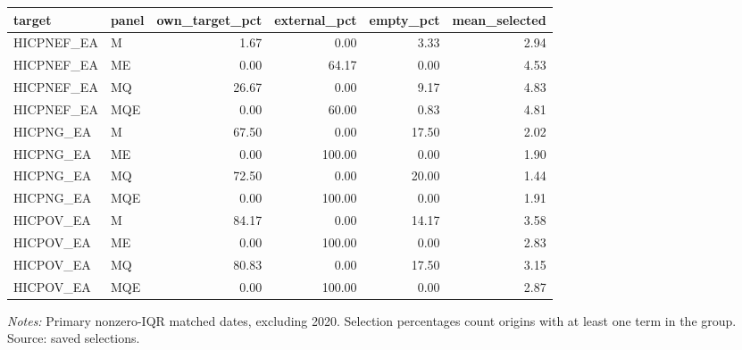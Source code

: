 \begin{threeparttable}
\begin{tabular}{llrrrr}
\toprule
target & panel & own\_target\_pct & external\_pct & empty\_pct & mean\_selected \\
\midrule
HICPNEF\_EA & M & 1.67 & 0.00 & 3.33 & 2.94 \\
HICPNEF\_EA & ME & 0.00 & 64.17 & 0.00 & 4.53 \\
HICPNEF\_EA & MQ & 26.67 & 0.00 & 9.17 & 4.83 \\
HICPNEF\_EA & MQE & 0.00 & 60.00 & 0.83 & 4.81 \\
HICPNG\_EA & M & 67.50 & 0.00 & 17.50 & 2.02 \\
HICPNG\_EA & ME & 0.00 & 100.00 & 0.00 & 1.90 \\
HICPNG\_EA & MQ & 72.50 & 0.00 & 20.00 & 1.44 \\
HICPNG\_EA & MQE & 0.00 & 100.00 & 0.00 & 1.91 \\
HICPOV\_EA & M & 84.17 & 0.00 & 14.17 & 3.58 \\
HICPOV\_EA & ME & 0.00 & 100.00 & 0.00 & 2.83 \\
HICPOV\_EA & MQ & 80.83 & 0.00 & 17.50 & 3.15 \\
HICPOV\_EA & MQE & 0.00 & 100.00 & 0.00 & 2.87 \\
\bottomrule
\end{tabular}
\begin{tablenotes}[flushleft]\footnotesize
\item \textit{Notes:} Primary nonzero-IQR matched dates, excluding 2020. Selection percentages count origins with at least one term in the group. Source: saved selections.
\end{tablenotes}
\end{threeparttable}
